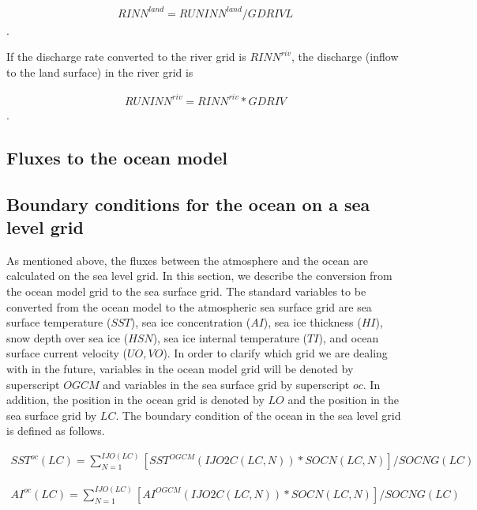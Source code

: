 \begin{eqnarray} RINN^{land}=RUNINN^{land}/GDRIVL \end{eqnarray}.

If the discharge rate converted to the river grid is \(RINN^{riv}\), the
discharge (inflow to the land surface) in the river grid is

\begin{eqnarray} RUNINN^{riv}=RINN^{riv}*GDRIV \end{eqnarray}.

\hypertarget{fluxes-to-the-ocean-model}{%
\subsection{Fluxes to the ocean model}\label{fluxes-to-the-ocean-model}}

\hypertarget{boundary-conditions-for-the-ocean-on-a-sea-level-grid}{%
\subsection{Boundary conditions for the ocean on a sea level
grid}\label{boundary-conditions-for-the-ocean-on-a-sea-level-grid}}

As mentioned above, the fluxes between the atmosphere and the ocean are
calculated on the sea level grid. In this section, we describe the
conversion from the ocean model grid to the sea surface grid. The
standard variables to be converted from the ocean model to the
atmospheric sea surface grid are sea surface temperature (\(SST\)), sea
ice concentration (\(AI\)), sea ice thickness (\(HI\)), snow depth over
sea ice (\(HSN\)), sea ice internal temperature (\(TI\)), and ocean
surface current velocity (\(UO,VO\)). In order to clarify which grid we
are dealing with in the future, variables in the ocean model grid will
be denoted by superscript \(OGCM\) and variables in the sea surface grid
by superscript \(oc\). In addition, the position in the ocean grid is
denoted by \(LO\) and the position in the sea surface grid by \(LC\).
The boundary condition of the ocean in the sea level grid is defined as
follows.

\begin{eqnarray} SST^{oc}(LC) = \sum_{N=1}^{IJO(LC)}[SST^{OGCM}(IJO2C(LC,N))*SOCN(LC,N)]/SOCNG(LC) \end{eqnarray}

\begin{eqnarray} AI^{oc}(LC) = \sum_{N=1}^{IJO(LC)}[AI^{OGCM}(IJO2C(LC,N))*SOCN(LC,N)]/SOCNG(LC) \end{eqnarray}

